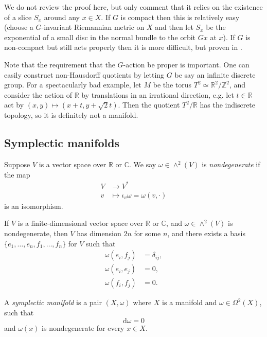 \documentclass[12pt,letterpaper,reqno]{article}
\numberwithin{equation}{section}
\newcommand{\R}{\ensuremath{\mathbb R}}
\newcommand{\C}{\ensuremath{\mathbb C}}
\newcommand{\Z}{\ensuremath{\mathbb Z}}
\newcommand{\de}{\mathrm{d}}
\newcommand{\ti}[1]{\textit{#1}}
\begin{document}
We do not review the proof here, but only comment that it
relies on the existence of a slice $S_x$ around any $x \in X$.
If $G$ is compact then this is relatively easy (choose a
$G$-invariant Riemannian metric on $X$ and then
let $S_x$ be the exponential of a small disc in the normal bundle
to the orbit $Gx$ at $x$). If $G$ is non-compact but still acts properly
then it is more difficult, but proven in \cite{MR0126506}.

Note that the requirement that the $G$-action be proper is
important. One
can easily construct non-Hausdorff quotients by letting $G$ be say
an infinite discrete group.
For a spectacularly bad example,
let $M$ be the torus $T^2 \simeq \R^2 / \Z^2$, and consider
the action of $\R$ by translations in an irrational direction,
e.g. let $t \in \R$ act by $(x,y) \mapsto (x+t,y+\sqrt{2}t)$.
Then the quotient $T^2 / \R$ has the indiscrete topology,
so it is definitely not a manifold.


\subsection{Symplectic manifolds}

\begin{defn} \label{def:nondegenerate-skew-pairing}
Suppose $V$ is a vector space over $\R$ or $\C$.
We say $\omega \in \wedge^2(V)$ is \ti{nondegenerate}
if the map
\begin{align}
  V &\to V^* \\
  v &\mapsto \iota_v \omega = \omega(v,\cdot)
\end{align}
is an isomorphism.
\end{defn}

\begin{prop}
\label{prop:standard-nondegenerate-skew-pairing}
If $V$ is a finite-dimensional vector space over $\R$ or $\C$, and
$\omega \in \wedge^2(V)$ is nondegenerate, then $V$ has
dimension $2n$ for some $n$, and there
exists a basis $\{e_1, \dots, e_n, f_1, \dots, f_n\}$ for $V$
such that
\begin{align}
\omega(e_i, f_j) &= \delta_{ij}, \\
\omega(e_i, e_j) &= 0, \\
\omega(f_i, f_j) &= 0.
\end{align}
\end{prop}

\begin{defn} \label{def:symplectic-manifold}
A \ti{symplectic manifold} is a pair $(X,\omega)$
where $X$ is a manifold and
$\omega \in \Omega^2(X)$, such that
\begin{equation}
  \de \omega = 0
\end{equation}
and $\omega(x)$ is nondegenerate for every $x \in X$.
\end{defn}
\end{document}
